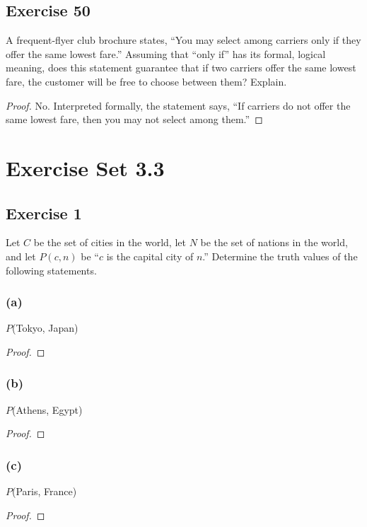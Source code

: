 \documentclass[14pt]{extarticle}
\begin{document}
\subsection{Exercise 50}
A frequent-flyer club brochure states, “You may select among carriers only if they offer the same lowest fare.” Assuming that “only if” has its formal, logical meaning, does this statement guarantee that if two carriers offer the same lowest fare, the customer will be free to choose between them? Explain.

\begin{proof}
No. Interpreted formally, the statement says, “If carriers do not offer the same lowest fare, then you may not select among them.”
\end{proof}

\section{Exercise Set 3.3}
\subsection{Exercise 1}
Let $C$ be the set of cities in the world, let $N$ be the set of nations in the world, and let $P(c, n)$ be “$c$ is the capital city of $n$.” Determine the truth values of the following statements.

\subsubsection{(a)}
$P$(Tokyo, Japan)

\begin{proof}

\end{proof}

\subsubsection{(b)}
$P$(Athens, Egypt)

\begin{proof}

\end{proof}

\subsubsection{(c)}
$P$(Paris, France)

\begin{proof}

\end{proof}
\end{document}
